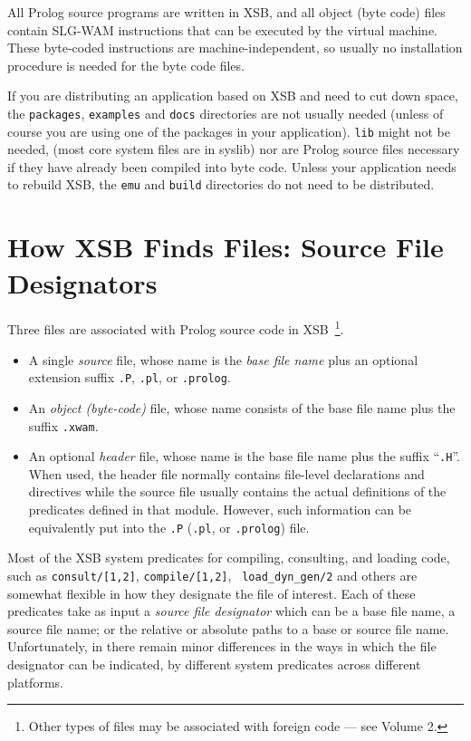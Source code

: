 \noindent
All Prolog source programs are written in XSB, and all object (byte
code) files contain SLG-WAM instructions that can be executed by the
virtual machine.  These byte-coded instructions are
machine-independent, so usually no installation procedure is needed
for the byte code files.

If you are distributing an application based on XSB and need to cut
down space, the {\tt packages}, {\tt examples} and {\tt docs}
directories are not usually needed (unless of course you are using one
of the packages in your application).  {\tt lib} might not be needed,
(most core system files are in syslib) nor are Prolog source files
necessary if they have already been compiled into byte code.  Unless
your application needs to rebuild XSB, the {\tt emu} and {\tt build}
directories do not need to be distributed.

\section{How XSB Finds Files: Source File Designators}  \label{sec:filenames}
%
Three files are associated with Prolog source code in
XSB~\footnote{Other types of files may be associated with foreign code
--- see Volume 2.}.
\begin{itemize}
\item A single {\it source} file, whose name is the {\em base file
  name} plus an optional extension suffix {\tt .P}, {\tt .pl}, or {\tt .prolog}.
\item An {\it object (byte-code)} file, whose name consists of the
  base file name plus the suffix {\tt .xwam}.
\item An optional {\it header} file, whose name is the base file name
  plus the suffix ``{\tt .H}''.  When used, the header file normally
  contains file-level declarations and directives while the source
  file usually contains the actual definitions of the predicates
  defined in that module.  However, such information can be
  equivalently put into the {\tt .P} ({\tt .pl}, or {\tt .prolog}) file.
\end{itemize}
%
Most of the XSB system predicates for compiling, consulting, and
loading code, such as {\tt consult/[1,2]}, {\tt compile/[1,2]}, {\tt
  load\_dyn\_gen/2} and others are somewhat flexible in how they
designate the file of interest.  Each of these predicates take as
input a {\em source file designator} which can be a base file name, a
source file name; or the relative or absolute paths to a base or
source file name.  Unfortunately, in \version{} there remain minor
differences in the ways in which the file designator can be indicated,
by different system predicates across different platforms.

